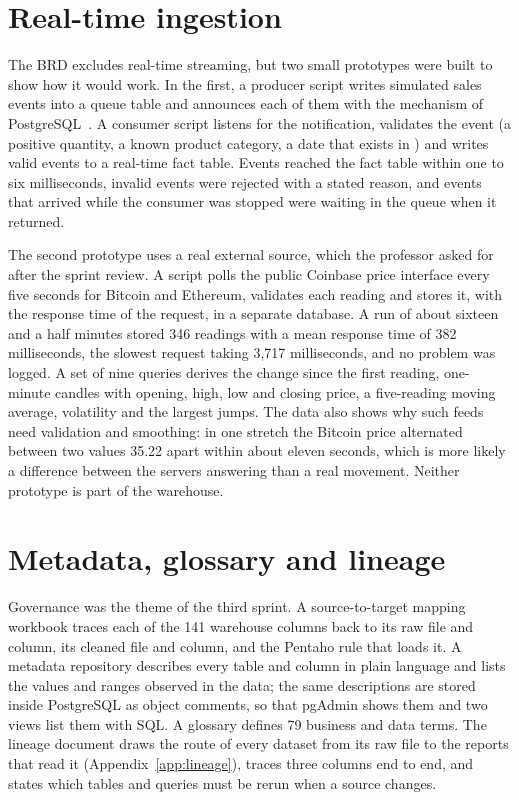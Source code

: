 \documentclass[12pt,a4paper]{report}
\newcommand{\code}[1]{\path{#1}}
\begin{document}
\section{Real-time ingestion}\label{sec:realtime}
The BRD excludes real-time streaming, but two small prototypes were built to show how it would work. In the first, a producer script writes simulated sales events into a queue table and announces each of them with the \code{NOTIFY} mechanism of PostgreSQL~\cite{pgdocs}. A consumer script listens for the notification, validates the event (a positive quantity, a known product category, a date that exists in \code{DimDate}) and writes valid events to a real-time fact table. Events reached the fact table within one to six milliseconds, invalid events were rejected with a stated reason, and events that arrived while the consumer was stopped were waiting in the queue when it returned.

The second prototype uses a real external source, which the professor asked for after the sprint review. A script polls the public Coinbase price interface every five seconds for Bitcoin and Ethereum, validates each reading and stores it, with the response time of the request, in a separate database. A run of about sixteen and a half minutes stored 346 readings with a mean response time of 382 milliseconds, the slowest request taking 3,717 milliseconds, and no problem was logged. A set of nine queries derives the change since the first reading, one-minute candles with opening, high, low and closing price, a five-reading moving average, volatility and the largest jumps. The data also shows why such feeds need validation and smoothing: in one stretch the Bitcoin price alternated between two values 35.22 apart within about eleven seconds, which is more likely a difference between the servers answering than a real movement. Neither prototype is part of the warehouse.

\section{Metadata, glossary and lineage}\label{sec:lineage}
Governance was the theme of the third sprint. A source-to-target mapping workbook traces each of the 141 warehouse columns back to its raw file and column, its cleaned file and column, and the Pentaho rule that loads it. A metadata repository describes every table and column in plain language and lists the values and ranges observed in the data; the same descriptions are stored inside PostgreSQL as object comments, so that pgAdmin shows them and two views list them with SQL. A glossary defines 79 business and data terms. The lineage document draws the route of every dataset from its raw file to the reports that read it (Appendix~\ref{app:lineage}), traces three columns end to end, and states which tables and queries must be rerun when a source changes.
\end{document}
